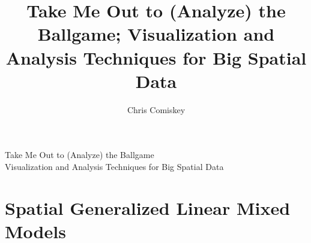 \documentclass[double,12pt]{beavtex}
\title{Take Me Out to (Analyze) the Ballgame; Visualization and Analysis Techniques for Big Spatial Data}
\author{Chris Comiskey}
\begin{document}
\maketitle
\mainmatter
\begingroup
\let\clearpage\relax
\begin{center}
\large
Take Me Out to (Analyze) the Ballgame \\ Visualization and Analysis Techniques for Big Spatial Data
\normalsize
\end{center}

% 

% 

% 

\chapter{Spatial Generalized Linear Mixed Models}

\pagebreak

% 






% 


\onehalfspacing





\pagebreak

\appendixpage
\appendix
\end{document}
